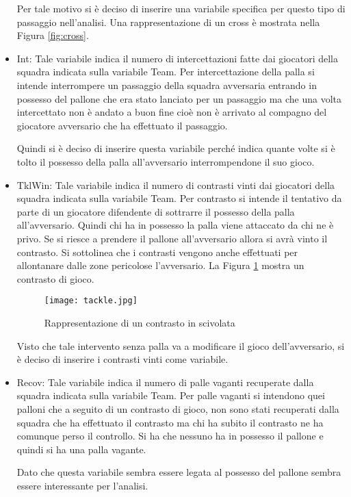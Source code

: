 \begin{itemize}
	Per tale motivo si è deciso di inserire una variabile specifica per questo tipo di passaggio nell'analisi. Una rappresentazione di un cross è mostrata nella Figura \ref{fig:cross}.
	\item \textsf{Int}: Tale variabile indica il numero di intercettazioni fatte dai giocatori della squadra indicata sulla variabile \textsf{Team}. Per intercettazione della palla si intende interrompere un passaggio della squadra avversaria entrando in possesso del pallone che era stato lanciato per un passaggio ma che una volta intercettato non è andato a buon fine cioè non è arrivato al compagno del giocatore avversario che ha effettuato il passaggio. 
	
	Quindi si è deciso di inserire questa variabile perché indica quante volte si è tolto il possesso della palla all'avversario interrompendone il suo gioco.
	\item \textsf{TklWin}: Tale variabile indica il numero di contrasti vinti dai giocatori della squadra indicata sulla variabile \textsf{Team}. Per contrasto si intende il tentativo da parte di un giocatore difendente di sottrarre il possesso della palla all'avversario. Quindi chi ha in possesso la palla viene attaccato da chi ne è privo. Se si riesce a prendere il pallone all'avversario allora si avrà vinto il contrasto. Si sottolinea che i contrasti vengono anche effettuati per allontanare dalle zone pericolose l'avversario. La Figura \ref{fig:tackle} mostra un contrasto di gioco.
	
	\begin{figure}[!ht]
		\begin{center}
			\texttt{[image: tackle.jpg]}
			\caption{Rappresentazione di un contrasto in scivolata} \label{fig:tackle}
		\end{center}
	\end{figure}
	
	Visto che tale intervento senza palla va a modificare il gioco dell'avversario, si è deciso di inserire i contrasti vinti come variabile. 
	
	\item \textsf{Recov}: Tale variabile indica il numero di palle vaganti recuperate dalla squadra indicata sulla variabile \textsf{Team}. Per palle vaganti si intendono quei palloni che a seguito di un contrasto di gioco, non sono stati recuperati dalla squadra che ha effettuato il contrasto ma chi ha subito il contrasto ne ha comunque perso il controllo. Si ha che nessuno ha in possesso il pallone e quindi si ha una palla vagante.
	
	Dato che questa variabile sembra essere legata al possesso del pallone sembra essere interessante per l'analisi.
	
\end{itemize}
